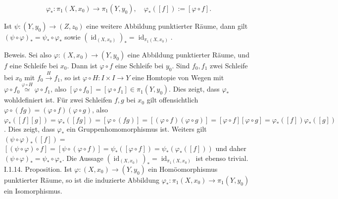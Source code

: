 \documentclass[10pt]{article}
\begin{document}
$$
\varphi_{*}: \pi_{1}\left(X, x_{0}\right) \rightarrow \pi_{1}\left(Y, y_{0}\right), \quad \varphi_{*}([f]):=[\varphi \circ f] .
$$

Ist $\psi:\left(Y, y_{0}\right) \rightarrow\left(Z, z_{0}\right)$ eine weitere Abbildung punktierter Räume, dann gilt $(\psi \circ \varphi)_{*}=\psi_{*} \circ \varphi_{*}$ sowie $\left(\operatorname{id}_{\left(X, x_{0}\right)}\right)_{*}=\operatorname{id}_{\pi_{1}\left(X, x_{0}\right)}$.

Beweis. Sei also $\varphi:\left(X, x_{0}\right) \rightarrow\left(Y, y_{0}\right)$ eine Abbildung punktierter Räume, und $f$ eine Schleife bei $x_{0}$. Dann ist $\varphi \circ f$ eine Schleife bei $y_{0}$. Sind $f_{0}, f_{1}$ zwei Schleife bei $x_{0}$ mit $f_{0} \xrightarrow{H} f_{1}$, so ist $\varphi \circ H: I \times I \rightarrow Y$ eine Homtopie von Wegen mit $\varphi \circ f_{0} \stackrel{\varphi \circ H}{\simeq} \varphi \circ f_{1}$, also $\left[\varphi \circ f_{0}\right]=\left[\varphi \circ f_{1}\right] \in \pi_{1}\left(Y, y_{0}\right)$. Dies zeigt, dass $\varphi_{*}$ wohldefiniert ist. Für zwei Schleifen $f, g$ bei $x_{0}$ gilt offensichtlich $\varphi \circ(f g)=(\varphi \circ f)(\varphi \circ g)$, also $\varphi_{*}([f][g])=\varphi_{*}([f g])=[\varphi \circ(f g)]=[(\varphi \circ f)(\varphi \circ g)]=[\varphi \circ f][\varphi \circ g]=\varphi_{*}([f]) \varphi_{*}([g])$. Dies zeigt, dass $\varphi_{*}$ ein Gruppenhomomorphismus ist. Weiters gilt $(\psi \circ \varphi)_{*}([f])=$ $[(\psi \circ \varphi) \circ f]=[\psi \circ(\varphi \circ f)]=\psi_{*}([\varphi \circ f])=\psi_{*}\left(\varphi_{*}([f])\right)$ und daher $(\psi \circ \varphi)_{*}=\psi_{*} \circ \varphi_{*}$. Die Aussage $\left(\operatorname{id}_{\left(X, x_{0}\right)}\right)_{*}=\operatorname{id}_{\pi_{1}\left(X, x_{0}\right)}$ ist ebenso trivial.\\
I.1.14. Proposition. Ist $\varphi:\left(X, x_{0}\right) \rightarrow\left(Y, y_{0}\right)$ ein Homöomorphismus punktierter Räume, so ist die induzierte Abbildung $\varphi_{*}: \pi_{1}\left(X, x_{0}\right) \rightarrow \pi_{1}\left(Y, y_{0}\right)$ ein Isomorphismus.
\end{document}
